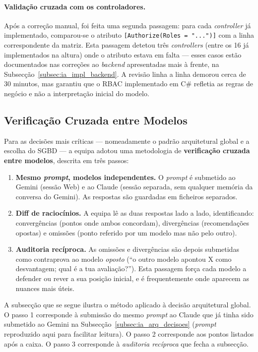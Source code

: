 \paragraph{Validação cruzada com os controladores.}
Após a correção manual, foi feita uma segunda passagem: para cada \textit{controller} já implementado, comparou-se o atributo \texttt{[Authorize(Roles = "...")]} com a linha correspondente da matriz. Esta passagem detetou três \textit{controllers} (entre os 16 já implementados na altura) onde o atributo estava em falta --- esses casos estão documentados nas correções ao \textit{backend} apresentadas mais à frente, na Subsecção~\ref{subsec:ia_impl_backend}. A revisão linha a linha demorou cerca de 30 minutos, mas garantiu que o RBAC implementado em C\# refletia as regras de negócio e não a interpretação inicial do modelo.

\subsection{Verificação Cruzada entre Modelos}\label{subsec:ia_arq_crossverification}

Para as decisões mais críticas --- nomeadamente o padrão arquitetural global e a escolha do SGBD --- a equipa adotou uma metodologia de \textbf{verificação cruzada entre modelos}, descrita em três passos:

\begin{enumerate}
    \item \textbf{Mesmo \textit{prompt}, modelos independentes.} O \textit{prompt} é submetido ao Gemini (sessão Web) e ao Claude (sessão separada, sem qualquer memória da conversa do Gemini). As respostas são guardadas em ficheiros separados.
    \item \textbf{Diff de raciocínios.} A equipa lê as duas respostas lado a lado, identificando: convergências (pontos onde ambos concordam), divergências (recomendações opostas) e omissões (ponto referido por um modelo mas não pelo outro).
    \item \textbf{Auditoria recíproca.} As omissões e divergências são depois submetidas como contraprova ao modelo \emph{oposto} (``o outro modelo apontou X como desvantagem; qual é a tua avaliação?''). Esta passagem força cada modelo a defender ou rever a sua posição inicial, e é frequentemente onde aparecem as nuances mais úteis.
\end{enumerate}

A subsecção que se segue ilustra o método aplicado à decisão arquitetural global. O passo 1 corresponde à submissão do mesmo \textit{prompt} ao Claude que já tinha sido submetido ao Gemini na Subsecção~\ref{subsec:ia_arq_decisoes} (\textit{prompt} reproduzido aqui para facilitar leitura). O passo 2 corresponde aos pontos listados após a caixa. O passo 3 corresponde à \emph{auditoria recíproca} que fecha a subsecção.

